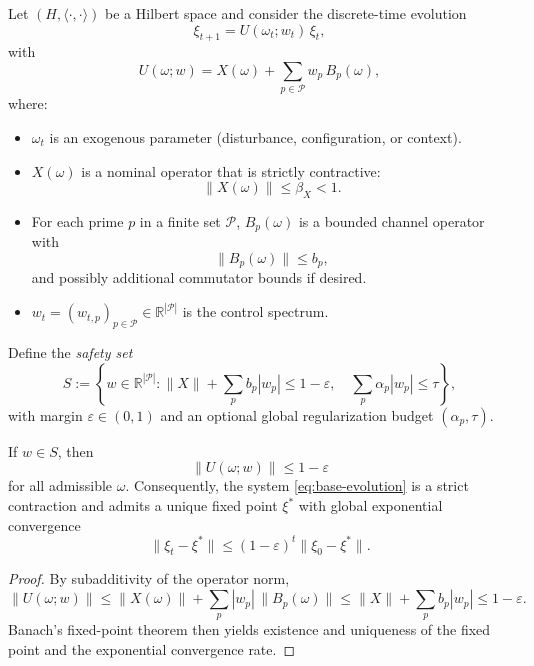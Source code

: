 \documentclass[11pt]{article}
\begin{document}
Let $(H,\langle\cdot,\cdot\rangle)$ be a Hilbert space and consider the discrete-time evolution
\begin{equation}
  \xi_{t+1} = U(\omega_t; w_t)\,\xi_t,
  \label{eq:base-evolution}
\end{equation}
with
\begin{equation}
  U(\omega; w)
  = X(\omega) + \sum_{p\in\mathcal P} w_p\, B_p(\omega),
  \label{eq:U-operator}
\end{equation}
where:
\begin{itemize}
  \item $\omega_t$ is an exogenous parameter (disturbance, configuration, or context).
  \item $X(\omega)$ is a nominal operator that is strictly contractive:
  \[
    \|X(\omega)\| \le \beta_X < 1.
  \]
  \item For each prime $p$ in a finite set $\mathcal P$, $B_p(\omega)$ is a bounded channel operator with
  \[
    \|B_p(\omega)\| \le b_p,
  \]
  and possibly additional commutator bounds if desired.
  \item $w_t = (w_{t,p})_{p\in\mathcal P}\in \mathbb R^{|\mathcal P|}$ is the control spectrum.
\end{itemize}

Define the \emph{safety set}
\begin{equation}
  S
  := \left\{
    w\in\mathbb R^{|\mathcal P|}:
    \|X\| + \sum_{p} b_p |w_p|
    \le 1 - \varepsilon,\quad
    \sum_{p} \alpha_p |w_p| \le \tau
  \right\},
  \label{eq:safety-set}
\end{equation}
with margin $\varepsilon\in(0,1)$ and an optional global regularization budget $(\alpha_p,\tau)$.

\begin{theorem}
If $w\in S$, then
\[
\|U(\omega; w)\|\le 1-\varepsilon
\]
for all admissible $\omega$. Consequently, the system \eqref{eq:base-evolution} is a strict contraction and admits a unique fixed point $\xi^\ast$ with global exponential convergence
\[
\|\xi_t - \xi^\ast\| \le (1-\varepsilon)^t \|\xi_0 - \xi^\ast\|.
\]
\end{theorem}

\begin{proof}
By subadditivity of the operator norm,
\[
\|U(\omega;w)\|
\le \|X(\omega)\| + \sum_{p} |w_p|\,\|B_p(\omega)\|
\le \|X\| + \sum_p b_p |w_p|
\le 1 - \varepsilon.
\]
Banach's fixed-point theorem then yields existence and uniqueness of the fixed point and the exponential convergence rate.
\end{proof}
\end{document}
